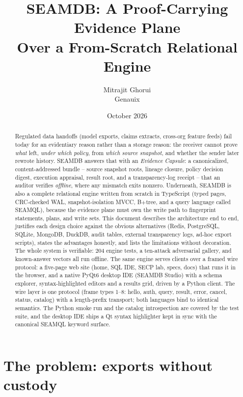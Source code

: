 \documentclass[11pt]{article}
\title{SEAMDB: A Proof-Carrying Evidence Plane\\Over a From-Scratch Relational Engine}
\author{Mitrajit Ghorui \\ Genauix}
\date{October 2026}
\begin{document}
\maketitle

\begin{abstract}
Regulated data handoffs (model exports, claims extracts, cross-org feature
feeds) fail today for an evidentiary reason rather than a storage reason: the
receiver cannot prove \emph{what} left, \emph{under which policy}, from
\emph{which source snapshot}, and whether the sender later rewrote history.
SEAMDB answers that with an \emph{Evidence Capsule}: a canonicalized,
content-addressed bundle -- source snapshot roots, lineage closure, policy
decision digest, execution appraisal, result root, and a transparency-log
receipt -- that an auditor verifies \emph{offline}, where any mismatch exits
nonzero. Underneath, SEAMDB is also a complete relational engine written from
scratch in TypeScript (typed pages, CRC-checked WAL, snapshot-isolation MVCC,
B$+$tree, and a query language called SEAMQL), because the evidence plane must
own the write path to fingerprint statements, plans, and write sets. This
document describes the architecture end to end, justifies each design choice
against the obvious alternatives (Redis, PostgreSQL, SQLite, MongoDB, DuckDB,
audit tables, external transparency logs, ad-hoc export scripts), states the
advantages honestly, and lists the limitations without decoration. The whole
system is verifiable: 204 engine tests, a ten-attack adversarial gallery, and
known-answer vectors all run offline. The same engine serves clients over a
framed wire protocol: a five-page web site (home, SQL IDE, SECP lab, specs,
docs) that runs it in the browser, and a native PyQt6 desktop IDE (SEAMDB
Studio) with a schema explorer, syntax-highlighted editors and a results
grid, driven by a Python client. The wire layer is one protocol (frame types
1--8: hello, auth, query, result, error, cancel, status, catalog) with a
length-prefix transport; both languages bind to identical semantics. The
Python smoke run and the catalog introspection are covered by the test
suite, and the desktop IDE ships a Qt syntax highlighter kept in sync with
the canonical SEAMQL keyword surface.
\end{abstract}

\tableofcontents

\section{The problem: exports without custody}
\label{sec:problem}
\end{document}
